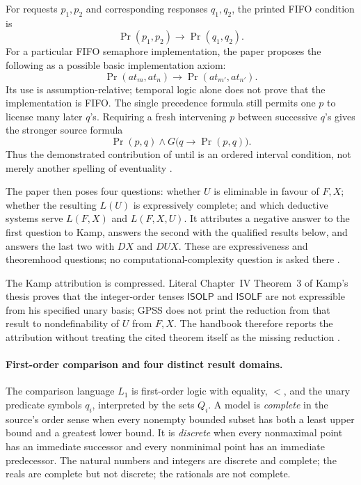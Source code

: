 For requests \(p_1,p_2\) and corresponding responses \(q_1,q_2\), the printed
FIFO condition is
\[
 \operatorname{Pr}(p_1,p_2)\to\operatorname{Pr}(q_1,q_2).
\]
For a particular FIFO semaphore implementation, the paper proposes the
following as a possible basic implementation axiom:
\[
 \operatorname{Pr}(\mathit{at}_m,\mathit{at}_n)
 \to
 \operatorname{Pr}(\mathit{at}_{m'},\mathit{at}_{n'}).
\]
Its use is assumption-relative; temporal logic alone does not prove that the
implementation is FIFO.
The single precedence formula still permits one \(p\) to license many later
\(q\)'s.  Requiring a fresh intervening \(p\) between successive \(q\)'s gives
the stronger source formula
\[
 \operatorname{Pr}(p,q)\land
 G\bigl(q\to\operatorname{Pr}(p,q)\bigr).
\]
Thus the demonstrated contribution of until is an ordered interval condition,
not merely another spelling of eventuality
\cite[pp.~167--168]{GabbayPnueliShelahStavi1980}.

The paper then poses four questions: whether \(U\) is eliminable in favour of
\(F,X\); whether the resulting \(L(U)\) is expressively complete; and which
deductive systems serve \(L(F,X)\) and \(L(F,X,U)\).  It attributes a negative
answer to the first question to Kamp, answers the second with the qualified
results below, and answers the last two with \(DX\) and \(DUX\).  These are
expressiveness and theoremhood questions; no computational-complexity question
is asked there \cite[pp.~168--169]{GabbayPnueliShelahStavi1980}.

The Kamp attribution is compressed.  Literal Chapter~IV Theorem~3 of Kamp's
thesis proves that the integer-order tenses \(\mathsf{ISOLP}\) and
\(\mathsf{ISOLF}\) are not expressible from his specified unary basis; GPSS
does not print the reduction from that result to nondefinability of \(U\) from
\(F,X\).  The handbook therefore reports the attribution without treating the
cited theorem itself as the missing reduction
\cite[ch.~IV, pp.~100--108]{Kamp1968}.

\paragraph{First-order comparison and four distinct result domains.}
The comparison language \(L_1\) is first-order logic with equality, \(<\), and
the unary predicate symbols \(q_i\), interpreted by the sets \(Q_i\).  A model
is \emph{complete} in the source's order
sense when every nonempty bounded subset has both a least upper bound and a
greatest lower bound.  It is \emph{discrete} when every nonmaximal point has an
immediate successor and every nonminimal point has an immediate predecessor.
The natural numbers and integers are discrete and complete; the reals are
complete but not discrete; the rationals are not complete.

